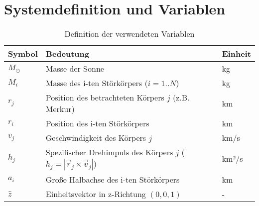 \section{Systemdefinition und Variablen}

\renewcommand{\arraystretch}{1.2}

\begin{table}[H]
    \centering
    \begin{tabularx}{\textwidth}{>{\raggedright\arraybackslash}X >{\raggedright\arraybackslash}X >{\raggedright\arraybackslash}X}
        \toprule
        \textbf{Symbol} & \textbf{Bedeutung} & \textbf{Einheit} \\
        \midrule
        $M_{\odot}$ & Masse der Sonne & kg \\
        $M_{i}$ & Masse des i-ten Störkörpers ($i=1..N$) & kg \\
        $r_{j}$ & Position des betrachteten Körpers $j$ (z.B. Merkur) & km \\
        $r_{i}$ & Position des i-ten Störkörpers & km \\
        $v_{j}$ & Geschwindigkeit des Körpers $j$ & km/s \\
        $h_{j}$ & Spezifischer Drehimpuls des Körpers $j$ ($h_{j} = |\vec{r}_{j} \times \vec{v}_{j}|$) & km²/s \\
        $a_{i}$ & Große Halbachse des i-ten Störkörpers & km \\
        $\hat{z}$ & Einheitsvektor in z-Richtung $(0,0,1)$ & - \\
        \bottomrule
    \end{tabularx}
    \caption{Definition der verwendeten Variablen}
\end{table}